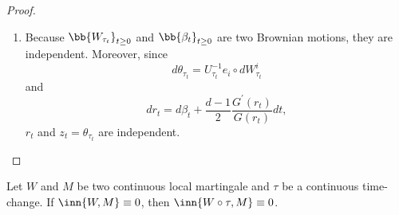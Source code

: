 \begin{exam}
\begin{proof}
\begin{enumerate}[label=\Roman*.]
            \item Because $\bb{W_{\tau_t}}_{t \geq 0}$ and $\bb{\beta_t}_{t \geq 0}$ are two Brownian motions, they are independent. Moreover, since
            \begin{equation*}
                d\theta_{\tau_t} = U_{\tau_t}^{-1}e_i \circ dW^i_{\tau_t}
            \end{equation*}
            and 
            \begin{equation*}
                dr_t = d\beta_t + \frac{d-1}{2}\frac{G^\prime(r_t)}{G(r_t)}dt,
            \end{equation*}
            $r_t$ and $z_t = \theta_{\tau_t}$ are independent. \qedhere
        \end{enumerate}
    \end{proof}
\end{exam}

\begin{lem}
    Let $W$ and $M$ be two continuous local martingale and $\tau$ be a continuous time-change. If $\inn{W,M} \equiv 0$, then $\inn{W \circ \tau, M} \equiv 0$.
\end{lem}


